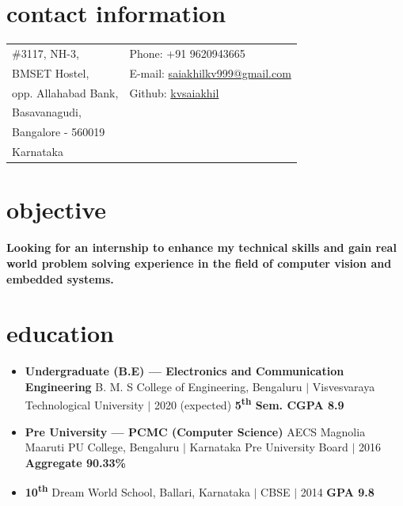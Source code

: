 \documentclass[margin,line]{res}
\begin{document}
	\begin{resume}


		\section{\sc contact information}
			\begin{tabular}{@{}p{3.5in}p{3.5in}}
				\#3117, NH-3,          & Phone:  +91 9620943665 \\
				BMSET Hostel,        & E-mail: \href{saiakhilkv999@gmail.com}{saiakhilkv999@gmail.com} \\
				opp. Allahabad Bank, & Github: \href{https://github.com/kvsaiakhil}{kvsaiakhil}\\
				Basavanagudi, & \\
				Bangalore - 560019 \\
				Karnataka\\
			\end{tabular}

		\section{\sc objective}
			\textbf{Looking for an internship to enhance my technical skills and gain real world problem solving experience in the field of computer vision and embedded systems.}

		\section{\sc  education}
			\begin{itemize}
				\item \textbf{Undergraduate (B.E) --- Electronics and Communication Engineering} \newline
					\small B. M. S College of Engineering, Bengaluru $\vert$ Visvesvaraya Technological University $\vert$ 2020 (expected) \newline
					\null\hfill \textbf{5\textsuperscript{th} Sem. CGPA 8.9}

				\item \textbf{Pre University --- PCMC (Computer Science)} \newline
					\small AECS Magnolia Maaruti PU College, Bengaluru $\vert$ Karnataka Pre University Board $\vert$ 2016 \newline
					\null\hfill \textbf{Aggregate 90.33\%}

				\item \textbf{10\textsuperscript{th}} \newline
					\small Dream World School, Ballari, Karnataka $\vert$ CBSE $\vert$ 2014 \newline
					\null\hfill \textbf{GPA 9.8}
			\end{itemize}


\end{resume}
\end{document}
